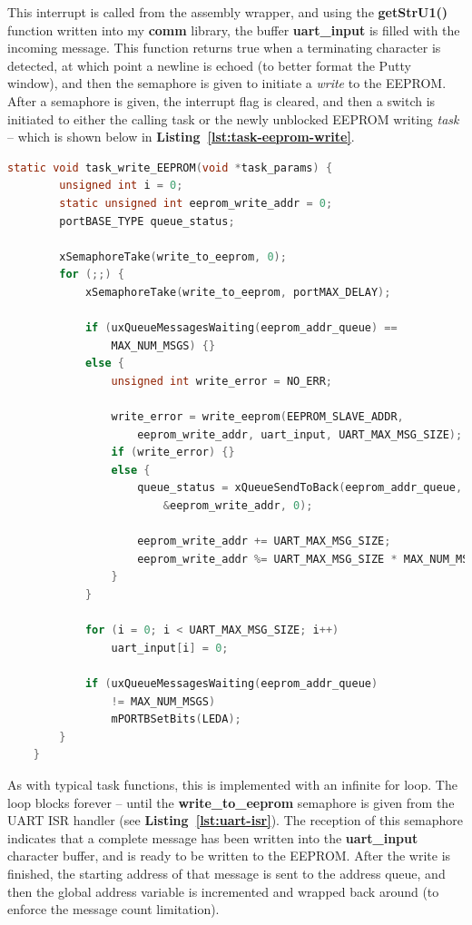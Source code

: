 \documentclass[a4paper, 12pt]{article}
\begin{document}
This interrupt is called from the assembly wrapper, and using the \textbf{getStrU1()} function written into my \textbf{comm} library, the buffer \textbf{uart\_input} is filled with the incoming message. This function returns true when a terminating character is detected, at which point a newline is echoed (to better format the Putty window), and then the semaphore is given to initiate a \emph{write} to the EEPROM. After a semaphore is given, the interrupt flag is cleared, and then a switch is initiated to either the calling task or the newly unblocked EEPROM writing \emph{task} -- which is shown below in \textbf{Listing~\ref{lst:task-eeprom-write}}.

	\begin{mdframed}[backgroundcolor=code-gray, roundcorner=10pt,
								innerleftmargin=5, innertopmargin=5, innerbottommargin=5]	
	\begin{lstlisting}[language=C, caption=EEPROM Writing Task, tabsize=2, label={lst:task-eeprom-write}]
	static void task_write_EEPROM(void *task_params) {
		unsigned int i = 0;
		static unsigned int eeprom_write_addr = 0;
		portBASE_TYPE queue_status;
	
		xSemaphoreTake(write_to_eeprom, 0);
		for (;;) {
			xSemaphoreTake(write_to_eeprom, portMAX_DELAY);

			if (uxQueueMessagesWaiting(eeprom_addr_queue) ==
				MAX_NUM_MSGS) {}
			else {
				unsigned int write_error = NO_ERR;
			
				write_error = write_eeprom(EEPROM_SLAVE_ADDR,
					eeprom_write_addr, uart_input, UART_MAX_MSG_SIZE);
				if (write_error) {}
				else {
					queue_status = xQueueSendToBack(eeprom_addr_queue,
						&eeprom_write_addr, 0);

					eeprom_write_addr += UART_MAX_MSG_SIZE;
					eeprom_write_addr %= UART_MAX_MSG_SIZE * MAX_NUM_MSGS;
				}
			}

			for (i = 0; i < UART_MAX_MSG_SIZE; i++)
				uart_input[i] = 0;

			if (uxQueueMessagesWaiting(eeprom_addr_queue)
				!= MAX_NUM_MSGS)
				mPORTBSetBits(LEDA);
		}
	}
	\end{lstlisting}
	\end{mdframed}
	
As with typical task functions, this is implemented with an infinite for loop. The loop blocks forever -- until the \textbf{write\_to\_eeprom} semaphore is given from the UART ISR handler (see \textbf{Listing~\ref{lst:uart-isr}}). The reception of this semaphore indicates that a complete message has been written into the \textbf{uart\_input} character buffer, and is ready to be written to the EEPROM. After the write is finished, the starting address of that message is sent to the address queue, and then the global address variable is incremented and wrapped back around (to enforce the message count limitation).
\end{document}
